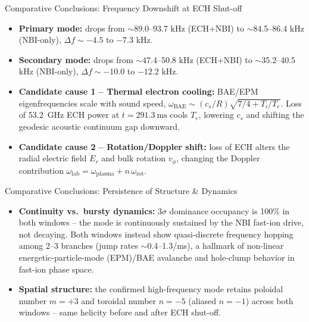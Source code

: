 \documentclass[aspectratio=169]{beamer}
\begin{document}
\begin{frame}{Comparative Conclusions: Frequency Downshift at ECH Shut-off}
    \begin{itemize}
        \item \textbf{Primary mode:} drops from $\sim$89.0--93.7 kHz (ECH+NBI) to $\sim$84.5--86.4 kHz (NBI-only), $\Delta f \sim -4.5$ to $-7.3$ kHz.
        \item \textbf{Secondary mode:} drops from $\sim$47.4--50.8 kHz (ECH+NBI) to $\sim$35.2--40.5 kHz (NBI-only), $\Delta f \sim -10.0$ to $-12.2$ kHz.
        \item \textbf{Candidate cause 1 -- Thermal electron cooling:} BAE/EPM eigenfrequencies scale with sound speed, $\omega_{\text{BAE}} \sim (c_s/R)\sqrt{7/4 + T_i/T_e}$. Loss of \SI{53.2}{\giga\hertz} ECH power at $t=\SI{291.3}{\milli\second}$ cools $T_e$, lowering $c_s$ and shifting the geodesic acoustic continuum gap downward.
        \item \textbf{Candidate cause 2 -- Rotation/Doppler shift:} loss of ECH alters the radial electric field $E_r$ and bulk rotation $v_\phi$, changing the Doppler contribution $\omega_{\text{lab}} = \omega_{\text{plasma}} + n\,\omega_{\text{rot}}$.
    \end{itemize}
\end{frame}

\begin{frame}{Comparative Conclusions: Persistence of Structure \& Dynamics}
    \begin{itemize}
        \item \textbf{Continuity vs.\ bursty dynamics:} $3\sigma$ dominance occupancy is 100\% in both windows -- the mode is continuously sustained by the NBI fast-ion drive, not decaying. Both windows instead show quasi-discrete frequency hopping among 2--3 branches (jump rates $\sim$0.4--1.3/ms), a hallmark of non-linear energetic-particle-mode (EPM)/BAE avalanche and hole-clump behavior in fast-ion phase space.
        \item \textbf{Spatial structure:} the confirmed high-frequency mode retains poloidal number $m = +3$ and toroidal number $n = -5$ (aliased $n=-1$) across both windows -- same helicity before and after ECH shut-off.
    \end{itemize}
\end{frame}
\end{document}

